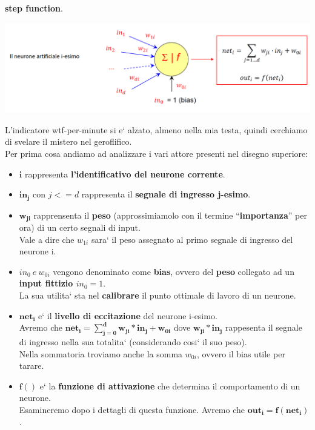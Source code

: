\textbf{step function}.
\begin{center}
    \includegraphics[scale=0.4]{images/Neurone_artificiale.png}
\end{center}
L'indicatore wtf-per-minute si e` alzato, almeno nella mia testa,
%
quindi cerchiamo di svelare il mistero nel geroflifico.
\\
Per prima cosa andiamo ad analizzare i vari attore presenti nel disegno superiore:
\begin{itemize}
    \item \( \mathbf{i}\) rappresenta \textbf{l'identificativo del neurone corrente}.
    \item \( \mathbf{in_j} \) con  \(j<=d\) rappresenta il 
%    
    \textbf{segnale di ingresso j-esimo}.
    \item \( \mathbf{w_{ji}} \) rapprensenta il \textbf{peso} 
%
    (approssimiamolo con il termine ``\textbf{importanza}'' per ora) di un 
%
    certo segnali di input.
\\
    Vale a dire che \(w_{1i}\) sara` il peso assegnato al primo segnale di
%   
    ingresso del neurone i. 
    \item \( in_0 \ e\  w_{0i} \) vengono denominato come \textbf{bias}, ovvero 
%
    del \textbf{peso} collegato ad un \textbf{input fittizio \(in_0=1\)}.
\\  
    La sua utilita` sta nel \textbf{calibrare} il punto ottimale di lavoro di un 
%
    neurone.
    \item \( \mathbf{net_i} \) e` il \textbf{livello di eccitazione} del neurone 
%
    i-esimo.
\\
    Avremo che \( \mathbf{net_i = \sum_{j=0}^{d}{w_{ji} * in_j + w_{0i}} } \) dove 
%
    \( \mathbf{w_{ji} * in_j} \) rappesenta il segnale di ingresso nella sua 
%
    totalita` (considerando cosi` il suo peso).
\\ 
    Nella sommatoria troviamo anche la somma \( w_{0i} \), ovvero il bias utile 
%
    per tarare.
    \item \( \mathbf{f()} \) e` la \textbf{funzione di attivazione}  che
%
    determina il comportamento di un neurone. 
\\ 
    Esamineremo dopo i dettagli di questa funzione.
%
    Avremo che \( \mathbf{out_i = f(net_i)} \).
\end{itemize}
